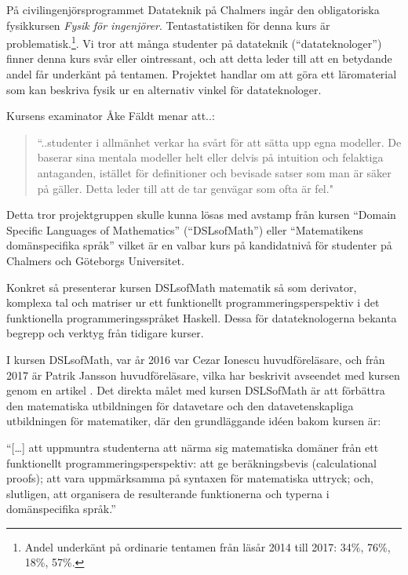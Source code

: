 \begin{draft}

På civilingenjörsprogrammet Datateknik på Chalmers ingår den obligatoriska fysikkursen
\textit{Fysik för ingenjörer}.
Tentastatistiken för denna kurs är
problematisk.\footnote{Andel underkänt på ordinarie tentamen från läsår 2014 till 2017: 34\%, 76\%, 18\%, 57\%. }\cite{tentastatistik}. Vi
tror att många studenter på datateknik (``datateknologer'') finner denna kurs
svår eller ointressant, och att detta leder till att en betydande andel får underkänt på tentamen.
Projektet handlar om att göra ett läromaterial som kan beskriva fysik ur en alternativ vinkel för datateknologer. %

Kursens examinator Åke Fäldt menar att..:

\begin{quote}
``..studenter i allmänhet verkar ha svårt för att sätta upp egna
modeller. De baserar sina mentala modeller helt eller delvis på
intuition och felaktiga antaganden, istället för definitioner och
bevisade satser som man är säker på gäller. Detta leder till att de
tar genvägar som ofta är fel."
\end{quote}

Detta tror projektgruppen skulle kunna lösas med avstamp från kursen ``Domain Specific Languages of
Mathematics'' (``DSLsofMath'') eller ``Matematikens domänspecifika språk''
vilket är en valbar kurs på kandidatnivå för studenter på Chalmers och
Göteborgs Universitet.

Konkret så presenterar kursen DSLsofMath matematik så som derivator, komplexa
tal och matriser ur ett
funktionellt programmeringsperspektiv i det funktionella programmeringsspråket
Haskell. Dessa för datateknologerna bekanta begrepp och verktyg från tidigare kurser.

I kursen DSLsofMath, var år 2016 var Cezar Ionescu huvudföreläsare, och från 2017 är Patrik Jansson
huvudföreläsare, vilka har beskrivit avseendet med kursen genom en artikel \cite{tfpie2015}. Det direkta målet
med kursen DSLSofMath är att förbättra den matematiska utbildningen för datavetare och den
datavetenskapliga utbildningen för matematiker, där den grundläggande idéen bakom kursen är:

\begin{center}
  ``[\dots] att uppmuntra studenterna att närma sig matematiska domäner från ett
  funktionellt programmeringsperspektiv: att ge beräkningsbevis (calculational
  proofs); att vara uppmärksamma på syntaxen för matematiska uttryck; och,
  slutligen, att organisera de resulterande funktionerna och typerna i
  domänspecifika språk.''\cite{lecture-notes}\cite{tfpie2015}
\end{center}


\end{draft}
